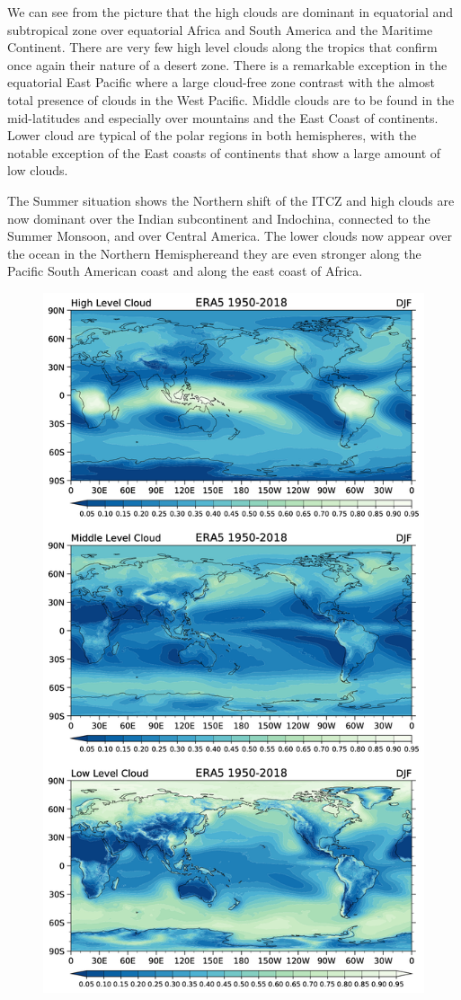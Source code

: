 We can see from the picture that the high clouds are dominant in
equatorial and subtropical zone over equatorial Africa and South America
and the Maritime Continent. There are very few high level clouds along
the tropics that confirm once again their nature of a desert zone. There
is a remarkable exception in the equatorial East Pacific where a large
cloud-free zone contrast with the almost total presence of clouds in the
West Pacific. Middle clouds are to be found in the mid-latitudes and
especially over mountains and the East Coast of continents. Lower cloud
are typical of the polar regions in both hemispheres, with the notable
exception of the East coasts of continents that show a large amount of
low clouds.

The Summer situation shows the Northern shift of the ITCZ and high
clouds are now dominant over the Indian subcontinent and Indochina,
connected to the Summer Monsoon, and over Central America. The lower
clouds now appear over the ocean in the Northern Hemisphereand they are
even stronger along the Pacific South American coast and along the east
coast of Africa.

\begin{figure}
\centering
\includegraphics[width = .7 \textwidth]{figs/GD/CloudsLevelDJF.png}
\caption{} \label{fig:}
\end{figure}

